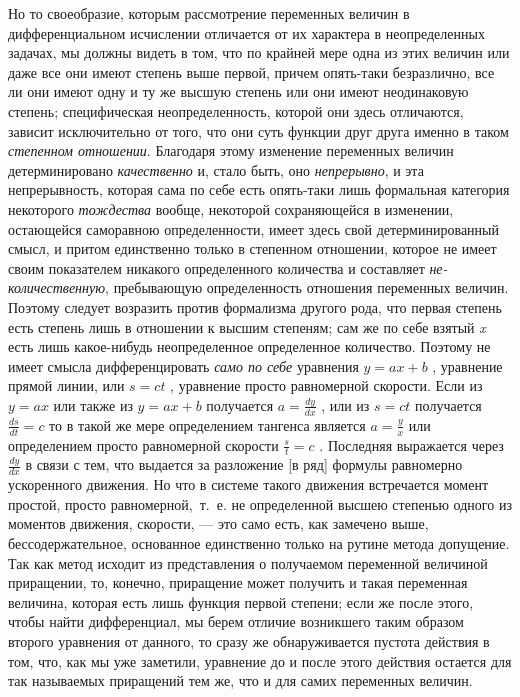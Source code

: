 \label{bkm:bm53c}Но то своеобразие, которым рассмотрение переменных величин в дифференциальном
исчислении отличается от их характера в неопределенных задачах, мы должны
видеть в том, что по крайней мере одна из этих величин или даже все они
имеют степень выше первой, причем опять-таки безразлично, все ли они имеют
одну и ту же высшую степень или они имеют неодинаковую степень;
специфическая неопределенность, которой они здесь отличаются, зависит
исключительно от того, что они суть функции друг друга именно в таком
{\em степенном отношении}. Благодаря этому изменение
переменных величин детерминировано {\em качественно} и,
стало быть, оно {\em непрерывно}, и эта непрерывность,
которая сама по себе есть опять-таки лишь формальная категория некоторого
{\em тождества} вообще, некоторой сохраняющейся в
изменении, остающейся саморавною определенности, имеет здесь свой
детерминированный смысл, и притом единственно только в степенном отношении,
которое не имеет своим показателем никакого определенного количества и
составляет {\em не-количественную}, пребывающую
определенность отношения переменных величин. Поэтому следует возразить
против формализма другого рода, что первая степень есть степень лишь в
отношении к высшим степеням; сам же по себе взятый
{\em x} есть лишь какое-нибудь неопределенное
определенное количество. Поэтому не имеет смысла дифференцировать
{\em само по себе} уравнения  $y=\mathit{ax}+b$ ,
уравнение прямой линии, или  $s=\mathit{ct}$ , уравнение просто равномерной
скорости. Если из  $y=\mathit{ax}$  или также из  $y=\mathit{ax}+b$ 
получается  $a=\frac{\mathit{dy}}{\mathit{dx}}$  , или из  $s=\mathit{ct}$ 
получается  $\frac{\mathit{ds}}{\mathit{dt}}=c$  то в такой же мере
определением тангенса является  $a=\frac y x$ или определением просто
равномерной скорости  $\frac s t=c$ . Последняя выражается через 
$\frac{\mathit{dy}}{\mathit{dx}}$  в связи с тем, что выдается за
разложение [в ряд] формулы равномерно ускоренного движения. Но что в
системе такого движения встречается момент простой, просто
равномерной,~т.~е. не определенной высшею степенью одного из моментов
движения, скорости, — это само есть, как замечено выше, бессодержательное,
основанное единственно только на рутине метода допущение. Так как метод
исходит из представления о получаемом переменной величиной приращении, то,
конечно, приращение может получить и такая переменная величина, которая
есть лишь функция первой степени; если же после этого, чтобы найти
дифференциал, мы берем отличие возникшего таким образом второго уравнения от
данного, то сразу же обнаруживается пустота действия в том, что, как мы уже
заметили, уравнение до и после этого действия остается для так называемых
приращений тем же, что и для самих переменных величин.

